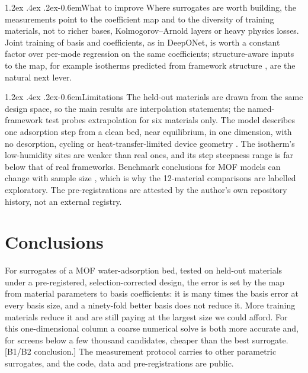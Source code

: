 \documentclass[10pt,a4paper]{article}
\makeatletter
\renewcommand\paragraph{\@startsection{paragraph}{4}{\z@}%
  {1.2ex \@plus .4ex \@minus .2ex}{-0.6em}{\normalfont\normalsize\bfseries}}
\makeatother
\begin{document}
\paragraph{What to improve} Where surrogates are worth building, the measurements point
to the coefficient map and to the diversity of training materials, not to richer bases,
Kolmogorov--Arnold layers or heavy physics losses. Joint training of basis and
coefficients, as in DeepONet, is worth a constant factor over per-mode regression on the
same coefficients; structure-aware inputs to the map, for example isotherms predicted from
framework structure \cite{goeminne2025ab}, are the natural next lever.

\paragraph{Limitations} The held-out materials are drawn from the same design space, so
the main results are interpolation statements; the named-framework test probes
extrapolation for six materials only. The model describes one adsorption step from a clean
bed, near equilibrium, in one dimension, with no desorption, cycling or
heat-transfer-limited device geometry \cite{lapotin2019adsorption}. The isotherm's
low-humidity sites are weaker than real ones, and its step steepness range is far below
that of real frameworks. Benchmark conclusions for MOF models can change with sample size
\cite{abaei2026benchmark}, which is why the 12-material comparisons are labelled
exploratory. The pre-registrations are attested by the author's own repository history,
not an external registry.

\section{Conclusions}
\label{sec:conclusions}

For surrogates of a MOF water-adsorption bed, tested on held-out materials under a
pre-registered, selection-corrected design, the error is set by the map from material
parameters to basis coefficients: it is many times the basis error at every basis size, and
a ninety-fold better basis does not reduce it. More training materials reduce it and are
still paying at the largest size we could afford. For this one-dimensional column a coarse
numerical solve is both more accurate and, for screens below a few thousand candidates,
cheaper than the best surrogate. [B1/B2 conclusion.] The measurement protocol carries to
other parametric surrogates, and the code, data and pre-registrations are public.
\end{document}
